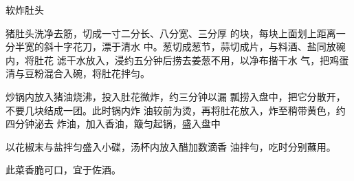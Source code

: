 \begin{recipe}{软炸肚头}

\ingredients


\cooking

\step 	猪肚头洗净去筋，切成一寸二分长、八分宽、三分厚 的块，每块上面划上距离一分半宽的斜十字花刀，漂于清水 中。葱切成葱节，蒜切成片，与料酒、盐同放碗内，将肚花 滤干水放入，浸约五分钟后捞去姜葱不用，以净布揩干水 气，把鸡蛋清与豆粉混合入碗，将肚花拌匀。

\step 	炒锅内放入猪油烧沸，投入肚花微炸，约三分钟以漏 瓢捞入盘中，把它分散开，不要几块结成一团。此时锅内炸 油较前为烫，再将肚花放入，炸至稍带黄色，约四分钟泌去 炸油，加入香油，簸匀起锅，盛入盘中

\step 以花椒末与盐拌匀盛入小碟，汤杯内放入醋加数滴香 油拌勻，吃时分别蘸用。

\notes

此菜香脆可口，宜于佐酒。

\end{recipe}

